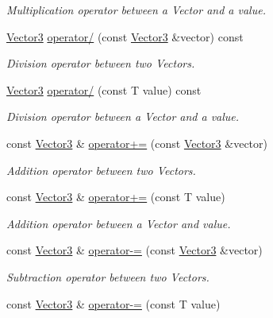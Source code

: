 \begin{DoxyCompactItemize}
\begin{DoxyCompactList}\small\item\em Multiplication operator between a Vector and a value. \end{DoxyCompactList}\item 
\hyperlink{classsparky_1_1_vector3}{Vector3} \hyperlink{classsparky_1_1_vector3_a888d07775b8ffd041951c94367625b88}{operator/} (const \hyperlink{classsparky_1_1_vector3}{Vector3} \&vector) const 
\begin{DoxyCompactList}\small\item\em Division operator between two Vectors. \end{DoxyCompactList}\item 
\hyperlink{classsparky_1_1_vector3}{Vector3} \hyperlink{classsparky_1_1_vector3_a6fb13111bb56ad54814ec914b2dd4641}{operator/} (const T value) const 
\begin{DoxyCompactList}\small\item\em Division operator between a Vector and a value. \end{DoxyCompactList}\item 
const \hyperlink{classsparky_1_1_vector3}{Vector3} \& \hyperlink{classsparky_1_1_vector3_a817183738d89f658cffedb59c6fd8a94}{operator+=} (const \hyperlink{classsparky_1_1_vector3}{Vector3} \&vector)
\begin{DoxyCompactList}\small\item\em Addition operator between two Vectors. \end{DoxyCompactList}\item 
const \hyperlink{classsparky_1_1_vector3}{Vector3} \& \hyperlink{classsparky_1_1_vector3_aaa1dae81b9dbdf91f62b6f6432051f23}{operator+=} (const T value)
\begin{DoxyCompactList}\small\item\em Addition operator between a Vector and value. \end{DoxyCompactList}\item 
const \hyperlink{classsparky_1_1_vector3}{Vector3} \& \hyperlink{classsparky_1_1_vector3_a4ca18e49433989be469fd1d16fd3bac9}{operator-\/=} (const \hyperlink{classsparky_1_1_vector3}{Vector3} \&vector)
\begin{DoxyCompactList}\small\item\em Subtraction operator between two Vectors. \end{DoxyCompactList}\item 
const \hyperlink{classsparky_1_1_vector3}{Vector3} \& \hyperlink{classsparky_1_1_vector3_a04ae4c2587c3bfa7398dff552a13967c}{operator-\/=} (const T value)

\end{DoxyCompactItemize}
